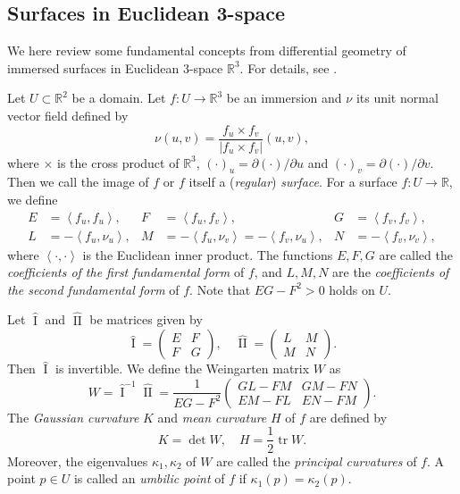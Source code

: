 \documentclass[11pt,a4paper,pdflatex,final]{amsart}
\theoremstyle{plain}
\theoremstyle{definition}
\theoremstyle{remark}
\newcommand{\tr}{\operatorname{tr}}
\newcommand{\0}{\bm{0}}
\newcommand{\R}{\mathbb{R}}
\newcommand{\first}{\operatorname{I}}
\newcommand{\second}{\operatorname{II}}
\newcommand{\what}{\widehat}
\newcommand{\inner}[2]{\left\langle{#1},{#2}\right\rangle}
\numberwithin{equation}{section}
\begin{document}
\subsection{Surfaces in Euclidean 3-space}
We here review some fundamental concepts from 
differential geometry of immersed surfaces 
in Euclidean $3$-space $\R^3$. 
For details, see \cite{carmo,hopf,porteous2}. 
{Let $U\subset\R^2$ be a domain. 
Let $f\colon U\to\R^3$ be an immersion 
and $\nu$ its unit normal vector field defined by 
\[
\nu(u,v)=\frac{f_u\times f_v}{|f_u\times f_v|}(u,v),
\] 
where $\times$ is the cross product of $\R^3$, 
$(\cdot)_u=\partial (\cdot)/\partial u$ and $(\cdot)_v=\partial (\cdot)/\partial v$. 
Then we call the image of $f$ or $f$ itself a (\textit{regular}) \textit{surface}. 
For a surface $f\colon U\to\R$, we define 
\begin{equation}\label{eq:fundamentals}
	\begin{aligned}
		E&=\inner{f_u}{f_u}, & F&=\inner{f_u}{f_v},& G&=\inner{f_v}{f_v},\\
		L&=-\inner{f_{u}}{\nu_u}, & M&=-\inner{f_u}{\nu_v}=-\inner{f_v}{\nu_u}, & 
		N&=-\inner{f_v}{\nu_v}, 
	\end{aligned}
\end{equation}
where $\inner{\cdot}{\cdot}$ is the Euclidean inner product. 
The functions $E,F,G$ are called the \textit{coefficients of the first fundamental form} of $f$, 
and $L,M,N$ are the \textit{coefficients of the second fundamental form} of $f$. 
Note that $EG-F^2>0$ holds on $U$. 

Let $\what{\first}$ and $\what{\second}$ be matrices given by 
\[
\what{\first}=\begin{pmatrix}
	E & F \\ F & G
\end{pmatrix},\quad 
\what{\second}=\begin{pmatrix}
	L & M \\ M & N
\end{pmatrix}.
\]
Then $\what{\first}$ is invertible. 
We define the Weingarten matrix $W$ as 
\[
W=\what{\first}^{-1}\what{\second}
=\frac{1}{EG-F^2}\begin{pmatrix}
	GL-FM & GM-FN \\ EM-FL & EN-FM
\end{pmatrix}.
\]
The \textit{Gaussian curvature} $K$ 
and \textit{mean curvature} $H$ of $f$ are defined by 
\[
K=\det{W},\quad H=\frac{1}{2}\tr W.
\]
Moreover, the eigenvalues $\kappa_1,\kappa_2$ of $W$ are called the \textit{principal curvatures} of $f$. 
A point $p\in U$ is called an \textit{umbilic point} of $f$ 
if $\kappa_1(p)=\kappa_2(p)$. 

}
\end{document}
